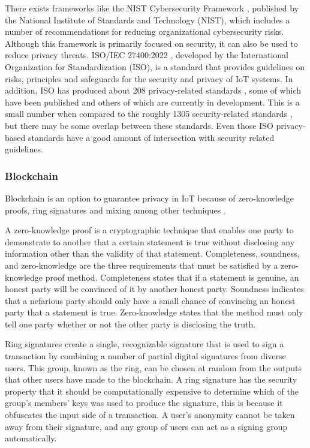 There exists frameworks like the NIST Cybersecurity Framework \cite{barrett2018framework},
published by the National Institute of Standards and Technology (NIST),
which includes a number of recommendations for reducing organizational
cybersecurity risks. Although this framework is primarily focused on
security, it can also be used to reduce privacy threats.
ISO/IEC 27400:2022 \cite{iso2022cybersecurity}, developed by the International
Organization for Standardization (ISO), is a standard that provides
guidelines on risks, principles and safeguards for the security and
privacy of IoT systems. In addition, ISO has produced about 208 privacy-related
standards \cite{iso2023privacysearch}, some of which have been published
and others of which are currently in development. This is a small number
when compared to the roughly 1305 security-related standards \cite{iso2023securitysearch},
but there may be some overlap between these standards. Even those ISO privacy-based
standards have a good amount of intersection with security related
guidelines.

\subsubsection{Blockchain}

Blockchain is an option to guarantee privacy in IoT because of zero-knowledge
proofs\cite{sun2021survey}, ring signatures \cite{mercer2016privacy} and mixing \cite{stone2021trustless}
among other techniques \cite{zhang2019security}.

A zero-knowledge proof is a cryptographic technique that enables one party
to demonstrate to another that a certain statement is true without disclosing
any information other than the validity of that statement. Completeness, soundness,
and zero-knowledge are the three requirements that must be satisfied by a
zero-knowledge proof method. Completeness states that if a
statement is genuine, an honest party will be convinced of it by another honest
party. Soundness indicates that a nefarious party should only have a small chance
of convincing an honest party that a statement is true. Zero-knowledge states
that the method must only tell one party whether or not the other party is
disclosing the truth.

Ring signatures create a single, recognizable signature that is used to sign
a transaction by combining a number of partial digital signatures from diverse
users. This group, known as the ring, can be chosen at random from the outputs
that other users have made to the blockchain. A ring signature has the security
property that it should be computationally expensive to determine which
of the group's members' keys was used to produce the signature, this is because
it obfuscates the input side of a transaction. A user's anonymity cannot
be taken away from their signature, and any group of users can act as a signing
group automatically.

